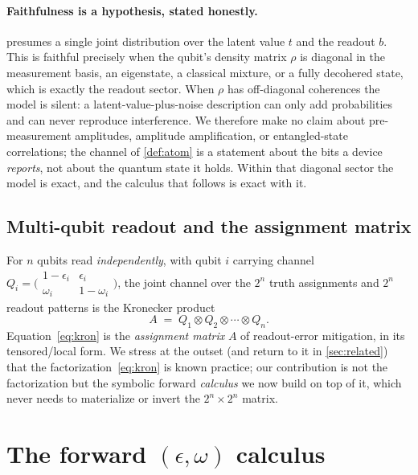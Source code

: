 \documentclass[a4paper,onecolumn,unpublished,nopdfoutputerror,allowtoday]{quantumarticle}
\numberwithin{equation}{section}
\theoremstyle{plain}
\theoremstyle{definition}
\theoremstyle{remark}
\newcommand{\eps}{\epsilon}
\newcommand{\tensor}{\otimes}
\begin{document}
\paragraph{Faithfulness is a hypothesis, stated honestly.}
 presumes a single joint distribution over the latent value $t$
and the readout $b$. This is faithful precisely when the qubit's density matrix
$\rho$ is diagonal in the measurement basis, an eigenstate, a classical
mixture, or a fully decohered state, which is exactly the readout sector. When
$\rho$ has off-diagonal coherences the model is silent: a latent-value-plus-noise
description can only add probabilities and can never reproduce interference. We
therefore make no claim about pre-measurement amplitudes, amplitude
amplification, or entangled-state correlations; the channel of \cref{def:atom}
is a statement about the bits a device \emph{reports}, not about the quantum
state it holds. Within that diagonal sector the model is exact, and the calculus
that follows is exact with it.

\subsection{Multi-qubit readout and the assignment matrix}

For $n$ qubits read \emph{independently}, with qubit $i$ carrying channel
$Q_i=\bigl(\begin{smallmatrix}1-\eps_i & \eps_i\\ \omega_i & 1-\omega_i\end{smallmatrix}\bigr)$,
the joint channel over the $2^n$ truth assignments and $2^n$ readout patterns is
the Kronecker product
\begin{equation}
\label{eq:kron}
  A \;=\; Q_1 \tensor Q_2 \tensor \cdots \tensor Q_n .
\end{equation}
Equation~\eqref{eq:kron} is the \emph{assignment matrix} $A$ of readout-error
mitigation, in its tensored/local form. We stress at the outset (and return to
it in \cref{sec:related}) that the factorization~\eqref{eq:kron} is known
practice; our contribution is not the factorization but the symbolic forward
\emph{calculus} we now build on top of it, which never needs to materialize or
invert the $2^n\times2^n$ matrix.


\section{The forward \texorpdfstring{$(\eps,\omega)$}{(epsilon, omega)} calculus}
\label{sec:calculus}
\end{document}
